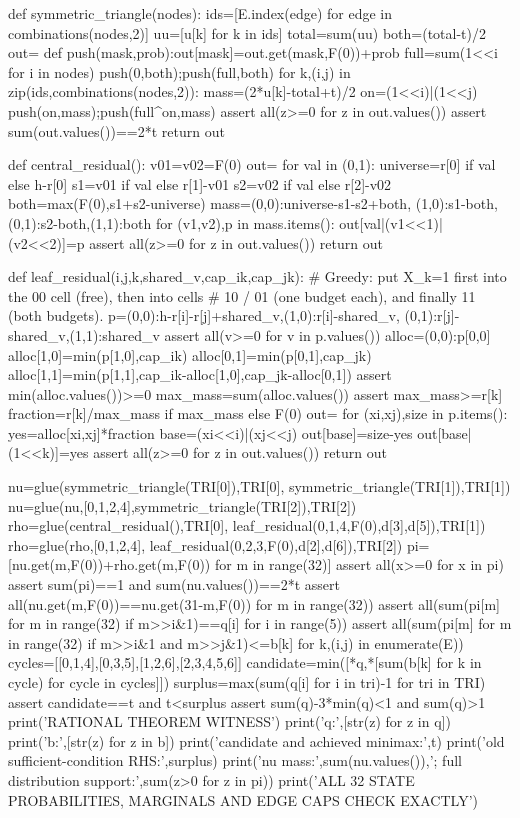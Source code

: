 \documentclass[11pt,a4paper]{ctexart}
\theoremstyle{remark}\newtheorem{remark}[theorem]{说明}
\begin{document}
\begin{CodeListing}
def symmetric_triangle(nodes):
    ids=[E.index(edge) for edge in combinations(nodes,2)]
    uu=[u[k] for k in ids]
    total=sum(uu)
    both=(total-t)/2
    out={}
    def push(mask,prob):out[mask]=out.get(mask,F(0))+prob
    full=sum(1<<i for i in nodes)
    push(0,both);push(full,both)
    for k,(i,j) in zip(ids,combinations(nodes,2)):
        mass=(2*u[k]-total+t)/2
        on=(1<<i)|(1<<j)
        push(on,mass);push(full^on,mass)
    assert all(z>=0 for z in out.values())
    assert sum(out.values())==2*t
    return out

def central_residual():
    v01=v02=F(0)
    out={}
    for val in (0,1):
        universe=r[0] if val else h-r[0]
        s1=v01 if val else r[1]-v01
        s2=v02 if val else r[2]-v02
        both=max(F(0),s1+s2-universe)
        mass={(0,0):universe-s1-s2+both,
              (1,0):s1-both,(0,1):s2-both,(1,1):both}
        for (v1,v2),p in mass.items():
            out[val|(v1<<1)|(v2<<2)]=p
    assert all(z>=0 for z in out.values())
    return out

def leaf_residual(i,j,k,shared_v,cap_ik,cap_jk):
    # Greedy: put X_k=1 first into the 00 cell (free), then into cells
    # 10 / 01 (one budget each), and finally 11 (both budgets).
    p={(0,0):h-r[i]-r[j]+shared_v,(1,0):r[i]-shared_v,
       (0,1):r[j]-shared_v,(1,1):shared_v}
    assert all(v>=0 for v in p.values())
    alloc={(0,0):p[0,0]}
    alloc[1,0]=min(p[1,0],cap_ik)
    alloc[0,1]=min(p[0,1],cap_jk)
    alloc[1,1]=min(p[1,1],cap_ik-alloc[1,0],cap_jk-alloc[0,1])
    assert min(alloc.values())>=0
    max_mass=sum(alloc.values())
    assert max_mass>=r[k]
    fraction=r[k]/max_mass if max_mass else F(0)
    out={}
    for (xi,xj),size in p.items():
        yes=alloc[xi,xj]*fraction
        base=(xi<<i)|(xj<<j)
        out[base]=size-yes
        out[base|(1<<k)]=yes
    assert all(z>=0 for z in out.values())
    return out

nu=glue(symmetric_triangle(TRI[0]),TRI[0],
        symmetric_triangle(TRI[1]),TRI[1])
nu=glue(nu,[0,1,2,4],symmetric_triangle(TRI[2]),TRI[2])
rho=glue(central_residual(),TRI[0],
         leaf_residual(0,1,4,F(0),d[3],d[5]),TRI[1])
rho=glue(rho,[0,1,2,4],
         leaf_residual(0,2,3,F(0),d[2],d[6]),TRI[2])
pi=[nu.get(m,F(0))+rho.get(m,F(0)) for m in range(32)]
assert all(x>=0 for x in pi)
assert sum(pi)==1 and sum(nu.values())==2*t
assert all(nu.get(m,F(0))==nu.get(31-m,F(0)) for m in range(32))
assert all(sum(pi[m] for m in range(32) if m>>i&1)==q[i] for i in range(5))
assert all(sum(pi[m] for m in range(32) if m>>i&1 and m>>j&1)<=b[k]
           for k,(i,j) in enumerate(E))
cycles=[[0,1,4],[0,3,5],[1,2,6],[2,3,4,5,6]]
candidate=min([*q,*[sum(b[k] for k in cycle) for cycle in cycles]])
surplus=max(sum(q[i] for i in tri)-1 for tri in TRI)
assert candidate==t and t<surplus
assert sum(q)-3*min(q)<1 and sum(q)>1
print('RATIONAL THEOREM WITNESS')
print('q:',[str(z) for z in q])
print('b:',[str(z) for z in b])
print('candidate and achieved minimax:',t)
print('old sufficient-condition RHS:',surplus)
print('nu mass:',sum(nu.values()),'; full distribution support:',sum(z>0 for z in pi))
print('ALL 32 STATE PROBABILITIES, MARGINALS AND EDGE CAPS CHECK EXACTLY')
\end{CodeListing}
\end{document}
